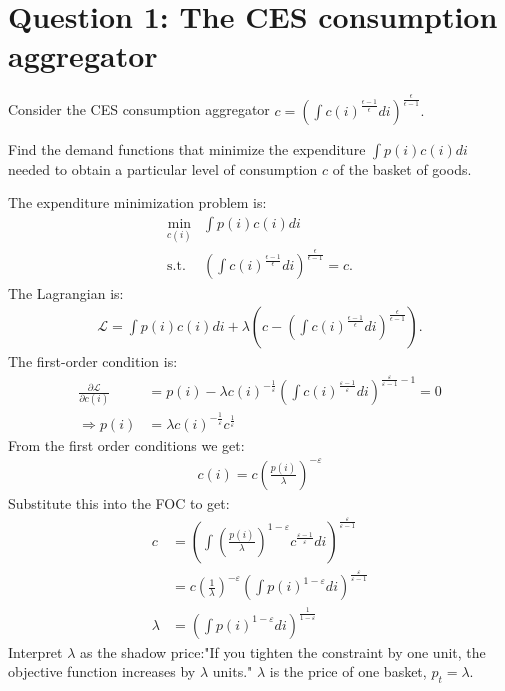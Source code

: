 \section*{Question 1: The CES consumption aggregator}
Consider the CES consumption aggregator $c=\left(\int c(i)^{\frac{\epsilon-1}{\epsilon}}di\right)^{\frac{\epsilon}{\epsilon-1}}.$

\begin{problem*}[1]
    Find the demand functions that minimize the expenditure $\int p(i)c(i)di$ needed to obtain a particular
level of consumption $c$ of the basket of goods.
\end{problem*}

\begin{solution}
    The expenditure minimization problem is:
    \begin{align*}
        \min_{c(i)} &\int p(i)c(i)di\\
        \text{s.t.} &\left(\int c(i)^{\frac{\epsilon-1}{\epsilon}}di\right)^{\frac{\epsilon}{\epsilon-1}}=c.
    \end{align*}
    The Lagrangian is:
    \begin{align*}
        \mathcal{L}=\int p(i)c(i)di+\lambda\left(c-\left(\int c(i)^{\frac{\epsilon-1}{\epsilon}}di\right)^{\frac{\epsilon}{\epsilon-1}}\right).
    \end{align*}
    The first-order condition is:
    \begin{align*}
        \frac{\partial \mathcal{L}}{\partial c(i)} &= p(i) - \lambda c(i)^{-\frac{1}{\varepsilon}}\left(\int c(i)^{\frac{\varepsilon-1}{\varepsilon}} di\right)^{\frac{\varepsilon}{\varepsilon-1}-1} = 0 \\
        \Rightarrow p(i) &= \lambda c(i)^{-\frac{1}{\varepsilon}}c^{\frac{1}{\varepsilon}}
    \end{align*}
    From the first order conditions we get:
    \begin{align*}
        c(i) = c \left( \frac{p(i)}{\lambda} \right)^{-\varepsilon}
    \end{align*}
    Substitute this into the FOC to get:
    \begin{align*}
        c &= \left( \int \left(\frac{p(i)}{\lambda }\right)^{1-\varepsilon} c^{\frac{\varepsilon-1}{\varepsilon}} di \right)^{\frac{\varepsilon}{\varepsilon-1}} \\
        &= c\left(\frac{1}{\lambda}\right)^{-\varepsilon} \left(\int p(i)^{1-\varepsilon} di\right)^{\frac{\varepsilon}{\varepsilon-1}} \\
        \lambda &= \left( \int p(i)^{1-\varepsilon} di \right)^{\frac{1}{1-\varepsilon}}
    \end{align*}
    Interpret $\lambda$ as the shadow price:"If you tighten the
    constraint by one unit, the objective function increases by $\lambda$ units."
    $\lambda$ is the price of one basket, $p_t = \lambda$.
    

\end{solution}
